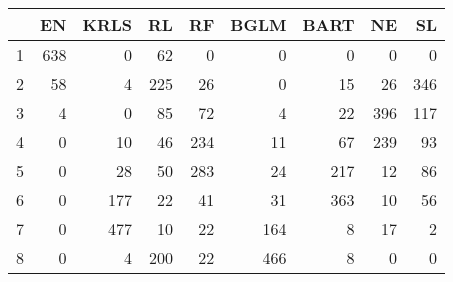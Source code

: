\begin{table}[ht]
\centering
\begin{tabular}{rrrrrrrrr}
  \hline
 & EN & KRLS & RL & RF & BGLM & BART & NE & SL \\ 
  \hline
1 & 638 &   0 &  62 &   0 &   0 &   0 &   0 &   0 \\ 
  2 &  58 &   4 & 225 &  26 &   0 &  15 &  26 & 346 \\ 
  3 &   4 &   0 &  85 &  72 &   4 &  22 & 396 & 117 \\ 
  4 &   0 &  10 &  46 & 234 &  11 &  67 & 239 &  93 \\ 
  5 &   0 &  28 &  50 & 283 &  24 & 217 &  12 &  86 \\ 
  6 &   0 & 177 &  22 &  41 &  31 & 363 &  10 &  56 \\ 
  7 &   0 & 477 &  10 &  22 & 164 &   8 &  17 &   2 \\ 
  8 &   0 &   4 & 200 &  22 & 466 &   8 &   0 &   0 \\ 
   \hline
\end{tabular}
\end{table}
